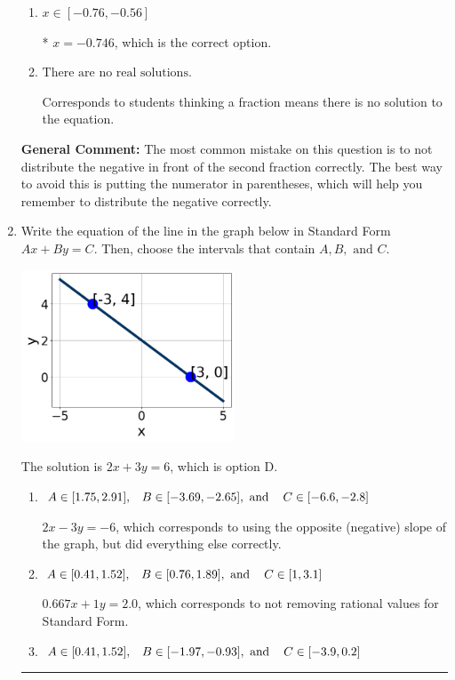 \documentclass{extbook}[14pt]
\newcommand{\litem}[1]{\item #1

\rule{\textwidth}{0.4pt}}
\begin{document}
\begin{enumerate}
{\begin{enumerate}[label=\Alph*.]
$x = 2.152$, which corresponds to getting the negative of the actual solution.
\item \( x \in [-0.76, -0.56] \)

* $x = -0.746$, which is the correct option.
\item \( \text{There are no real solutions.} \)

Corresponds to students thinking a fraction means there is no solution to the equation.
\end{enumerate}

\textbf{General Comment:} The most common mistake on this question is to not distribute the negative in front of the second fraction correctly. The best way to avoid this is putting the numerator in parentheses, which will help you remember to distribute the negative correctly.
}
\litem{
Write the equation of the line in the graph below in Standard Form $Ax+By=C$. Then, choose the intervals that contain $A, B, \text{ and } C$.

\begin{center}
    \includegraphics[width=0.5\textwidth]{../Figures/linearGraphToStandardA.png}
\end{center}


The solution is \( 2x + 3y = 6 \), which is option D.\begin{enumerate}[label=\Alph*.]
\item \( A \in [1.75, 2.91], \hspace{3mm} B \in [-3.69, -2.65], \text{ and } \hspace{3mm} C \in [-6.6, -2.8] \)

 $2x - 3y = -6$, which corresponds to using the opposite (negative) slope of the graph, but did everything else correctly.
\item \( A \in [0.41, 1.52], \hspace{3mm} B \in [0.76, 1.89], \text{ and } \hspace{3mm} C \in [1, 3.1] \)

 $0.667x + 1y = 2.0$, which corresponds to not removing rational values for Standard Form.
\item \( A \in [0.41, 1.52], \hspace{3mm} B \in [-1.97, -0.93], \text{ and } \hspace{3mm} C \in [-3.9, 0.2] \)


\end{enumerate}}
\end{enumerate}
\end{document}
